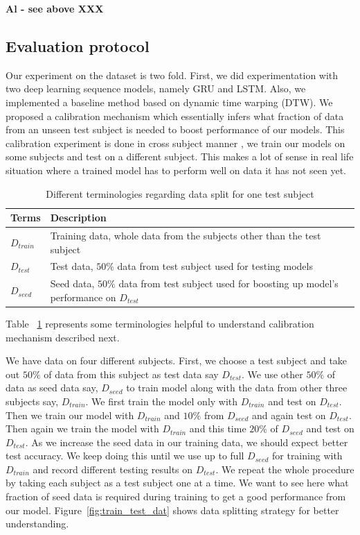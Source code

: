 \documentclass[10pt,twocolumn,letterpaper]{article}
\begin{document}
{\bf Al - see above XXX}



\subsection{Evaluation protocol}

Our experiment on the dataset is two fold. First, we did experimentation with two deep learning sequence models, namely GRU and LSTM. Also, we implemented a baseline method based on dynamic time warping (DTW). We proposed a calibration mechanism which essentially infers what fraction of data from an unseen test subject is needed to boost performance of our models. This calibration experiment is done in cross subject manner \eg, we train our models on some subjects and test on a different subject. This makes a lot of sense in real life situation where a trained model has to perform well on data it has not seen yet. 

\begin{table}[h]
	\begin{center}
		\begin{tabular}{|m{1cm}|m{5cm}|}
			\hline
			Terms & Description\\
			\hline\hline
			$D_{train}$ & Training data, whole data from the subjects other than the test subject \\
			\hline
			$D_{test}$ & Test data, $50\%$ data from test subject used for testing models\\
			\hline
			$D_{seed}$ & Seed data, $50\%$ data from test subject used for boosting up model's performance on $D_{test}$\\
			\hline
		\end{tabular}
	\end{center}
	\caption{Different terminologies regarding data split for one test subject}
	\label{table:terminology_eval}
\end{table}
Table ~\ref{table:terminology_eval} represents some terminologies helpful to understand calibration mechanism described next.

We have data on four different subjects. First, we choose a test subject and take out $50\%$ of data from this subject as test data say $D_{test}$. We use other $50\%$ of data as seed data say, $D_{seed}$ to train model along with the data from other three subjects say, $D_{train}$. We first train the model only with $D_{train}$ and test on $D_{test}$. Then we train our model with $D_{train}$ and $10\%$ from $D_{seed}$ and again test on $D_{test}$. Then again we train the model with $D_{train}$ and this time $20\%$ of $D_{seed}$ and test on $D_{test}$. As we increase the seed data in our training data, we should expect better test accuracy. We keep doing this until we use up to full $D_{seed}$ for training with $D_{train}$ and record different testing results on $D_{test}$. We repeat the whole procedure by taking each subject as a test subject one at a time. We want to see here what fraction of seed data is required during training to get a good performance from our model. Figure~\ref{fig:train_test_dat} shows data splitting strategy for better understanding.
\end{document}
